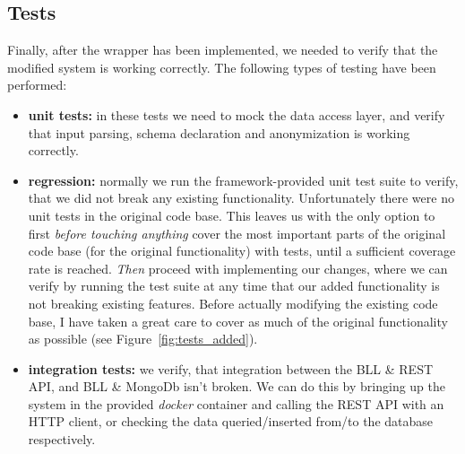 \subsection{Tests}

Finally, after the wrapper has been implemented, we needed to verify that the modified system is working correctly. The following types of testing have been performed:
\begin{itemize}
    \item \textbf{unit tests:} in these tests we need to mock the data access layer, and verify that input parsing, schema declaration and anonymization is working correctly.
    \item \textbf{regression:} normally we run the framework-provided unit test suite to verify, that we did not break any existing functionality. Unfortunately there were no unit tests in the original code base. This leaves us with the only option to first \emph{before touching anything} cover the most important parts of the original code base (for the original functionality) with tests, until a sufficient coverage rate is reached. \emph{Then} proceed with implementing our changes, where we can verify by running the test suite at any time that our added functionality is not breaking existing features. Before actually modifying the existing code base, I have taken a great care to cover as much of the original functionality as possible (see Figure~\ref{fig:tests_added}).
    \item \textbf{integration tests:} we verify, that integration between the BLL \& REST API, and BLL \& MongoDb isn't broken. We can do this by bringing up the system in the provided \emph{docker} container and calling the REST API with an HTTP client, or checking the data queried/inserted from/to the database respectively.
\end{itemize}

\vspace{\baselineskip}
